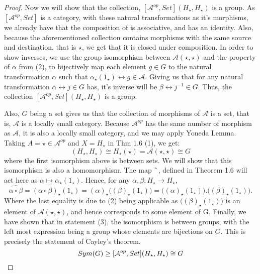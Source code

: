 \documentclass[18pt,a4paper]{article}
\theoremstyle{definition}
\begin{document}
\begin{proof}
		Now we will show that the collection, $[\mathcal{A} ^{op},Set](H_\star, H_\star)$ is a
		group. As $[\mathcal{A} ^{op},Set]$ is a category, with these natural transformations
		as it's morphisms, we already have that the composition of is associative,
		and has an identity. Also, because the aforementioned collection contains
		morphisms with the same source and destination, that is $\star$, we get that it is
		closed under composition. In order
		to show inverses, we use the group isomorphism between $\mathcal{A} (\star,\star)$ and
		the property of $\alpha$ from (2), to bijectively map each element $g\in G$ to the natural
		transformation $\alpha$ such that $\alpha_\star(1_\star) \leftrightarrow g \in \mathcal{A} $.
		Giving us that for any natural transformation $\alpha \leftrightarrow j\in G$ has, it's
		inverse will be $\beta \leftrightarrow j^{-1} \in G$. Thus, the
		collection $[ \mathcal{A} ^{op}, Set](H_\star,H_\star)$ is a group.

		Also, $G$ being a set gives us that the collection of morphisms of $\mathcal{A}$
		is a set, that is, $\mathcal{A} $ is a locally small category. Because
		$\mathcal{A} ^{op}$ has the same number of morphism as $\mathcal{A}$,
		it is also a locally small category, and we may apply Yoneda Lemma. Taking $A=\star
		\in \mathcal{A} ^{op}$ and $X=H_\star$ in Thm 1.6 (1), we get:
		\begin{equation} [ \mathcal{A} ^{op}, Set](H_\star,H_\star) \cong H_\star(\star)
		= \mathcal{A} (\star,\star) \cong G\end{equation}
		where the first isomorphism above is between sets. We will show that this
		isomorphism is also a homomorphism.
		The map $\string ^$, defined in Theorem 1.6 will act here as $\alpha
		\mapsto \alpha_\star (1_\star)$. Hence, for any $\alpha,\beta:H_\star
		\to H_\star$,
		\begin{equation}
			\widehat {\alpha \circ \beta}= (\alpha \circ \beta)_\star(1_\star)
			=(\alpha)_\star \Big( (\beta)_\star (1_\star) \Big)=
			\Big((\alpha)_\star(1_\star) \Big) . \Big( (\beta)_\star (1_\star) \Big).
		\end{equation}
		Where the last equality is due to (2) being applicable
		as $\Big((\beta)_\star (1_\star)\Big)$ is an element of $\mathcal{A} (\star,\star)$,
		and hence corresponds to some element of G.
		Finally, we have shown that in statement (3), the isomorphism is between groups,
		with the left most expression being a group whose elements are bijections
		on $G$. This is
		precisely the statement of Cayley's theorem.
		\[ Sym(G) \geq [ \mathcal{A} ^{op}, Set](H_\star,H_\star) \cong G \qedhere \]
	\end{proof}
\end{document}
